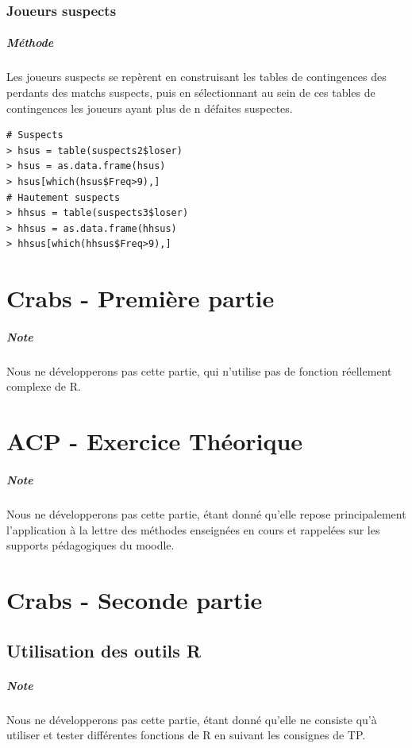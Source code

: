 \documentclass{report}
\begin{document}
\begin{appendices}
\subsection{Joueurs suspects}
\paragraph{Méthode}
Les joueurs suspects se repèrent en construisant les tables de contingences des perdants des matchs suspects, puis en sélectionnant au sein de ces tables de contingences les joueurs ayant plus de n défaites suspectes.
\begin{lstlisting}
# Suspects
> hsus = table(suspects2$loser)
> hsus = as.data.frame(hsus)
> hsus[which(hsus$Freq>9),]
# Hautement suspects
> hhsus = table(suspects3$loser)
> hhsus = as.data.frame(hhsus)
> hhsus[which(hhsus$Freq>9),]
\end{lstlisting}

\newpage
\chapter{Crabs - Première partie}
\paragraph{Note}
Nous ne développerons pas cette partie, qui n'utilise pas de fonction réellement complexe de R.

\chapter{ACP - Exercice Théorique}
\paragraph{Note}
Nous ne développerons pas cette partie, étant donné qu'elle repose principalement l'application à la lettre des méthodes enseignées en cours et rappelées sur les supports pédagogiques du moodle.

\newpage
\chapter{Crabs - Seconde partie}
\section{Utilisation des outils R}
\paragraph{Note}
Nous ne développerons pas cette partie, étant donné qu'elle ne consiste qu'à utiliser et tester différentes fonctions de R en suivant les consignes de TP.


\end{appendices}
\end{document}
